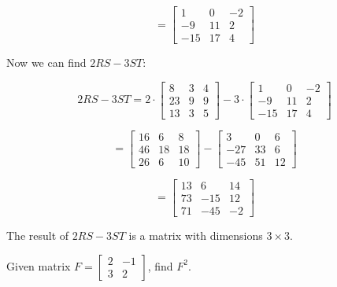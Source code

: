 \begin{solution}
    \[
        = \begin{bmatrix} 1 & 0 & -2 \\ -9 & 11 & 2 \\ -15 & 17 & 4 \end{bmatrix}
    \]

    Now we can find $2RS - 3ST$:

    \[
        2RS - 3ST = 2 \cdot \begin{bmatrix} 8 & 3 & 4 \\ 23 & 9 & 9 \\ 13 & 3 & 5 \end{bmatrix} - 3 \cdot \begin{bmatrix} 1 & 0 & -2 \\ -9 & 11 & 2 \\ -15 & 17 & 4 \end{bmatrix}
    \]

    \[
        = \begin{bmatrix} 16 & 6 & 8 \\ 46 & 18 & 18 \\ 26 & 6 & 10 \end{bmatrix} - \begin{bmatrix} 3 & 0 & 6 \\ -27 & 33 & 6 \\ -45 & 51 & 12 \end{bmatrix}
    \]

    \[
        = \begin{bmatrix} 13 & 6 & 14 \\ 73 & -15 & 12 \\ 71 & -45 & -2 \end{bmatrix}
    \]

    The result of $2RS - 3ST$ is a matrix with dimensions $3 \times 3$.

\end{solution}

\begin{example}
    Given matrix $F = \begin{bmatrix} 2 & -1 \\ 3 & 2 \end{bmatrix}$, find $F^2$.
\end{example}

